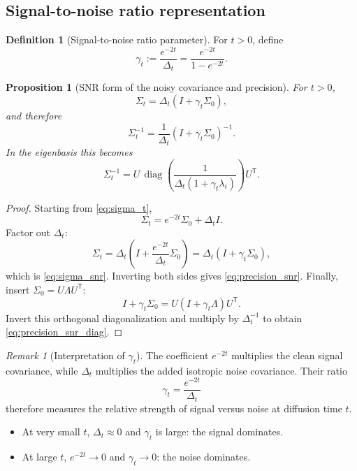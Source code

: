 \documentclass[11pt]{article}
\numberwithin{equation}{section}
\newtheorem{proposition}[theorem]{Proposition}
\theoremstyle{definition}
\newtheorem{definition}[theorem]{Definition}
\theoremstyle{remark}
\newtheorem{remark}[theorem]{Remark}
\newcommand{\diag}{\operatorname{diag}}
\newcommand{\Id}{I}
\newcommand{\trans}{\mathsf{T}}
\begin{document}
\subsection{Signal-to-noise ratio representation}

\begin{definition}[Signal-to-noise ratio parameter]
For $t>0$, define
\begin{equation}\label{eq:gamma_t}
\gamma_t:=\frac{e^{-2t}}{\Delta_t}=\frac{e^{-2t}}{1-e^{-2t}}.
\end{equation}
\end{definition}

\begin{proposition}[SNR form of the noisy covariance and precision]\label{prop:snr_form}
For $t>0$,
\begin{equation}\label{eq:sigma_snr}
\Sigma_t=\Delta_t(\Id+\gamma_t\Sigma_0),
\end{equation}
and therefore
\begin{equation}\label{eq:precision_snr}
\Sigma_t^{-1}=\frac{1}{\Delta_t}(\Id+\gamma_t\Sigma_0)^{-1}.
\end{equation}
In the eigenbasis this becomes
\begin{equation}\label{eq:precision_snr_diag}
\Sigma_t^{-1}
=
U\,
\diag\!\left(\frac{1}{\Delta_t(1+\gamma_t\lambda_i)}\right)
U^\trans.
\end{equation}
\end{proposition}

\begin{proof}
Starting from \eqref{eq:sigma_t},
\[
\Sigma_t=e^{-2t}\Sigma_0+\Delta_t\Id.
\]
Factor out $\Delta_t$:
\[
\Sigma_t=\Delta_t\left(\Id+\frac{e^{-2t}}{\Delta_t}\Sigma_0\right)
=\Delta_t(\Id+\gamma_t\Sigma_0),
\]
which is \eqref{eq:sigma_snr}. Inverting both sides gives \eqref{eq:precision_snr}. Finally, insert $\Sigma_0=U\Lambda U^\trans$:
\[
\Id+\gamma_t\Sigma_0
=
U(\Id+\gamma_t\Lambda)U^\trans.
\]
Invert this orthogonal diagonalization and multiply by $\Delta_t^{-1}$ to obtain \eqref{eq:precision_snr_diag}.
\end{proof}

\begin{remark}[Interpretation of \texorpdfstring{$\gamma_t$}{gamma t}]
The coefficient $e^{-2t}$ multiplies the clean signal covariance, while $\Delta_t$ multiplies the added isotropic noise covariance. Their ratio
\[
\gamma_t=\frac{e^{-2t}}{\Delta_t}
\]
therefore measures the relative strength of signal versus noise at diffusion time $t$.
\begin{itemize}[leftmargin=1cm]
\item At very small $t$, $\Delta_t\approx 0$ and $\gamma_t$ is large: the signal dominates.
\item At large $t$, $e^{-2t}\to 0$ and $\gamma_t\to 0$: the noise dominates.
\end{itemize}
\end{remark}
\end{document}
